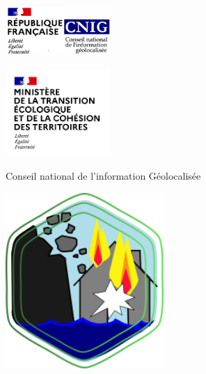 \documentclass[a4paper,12pt]{article}
\begin{document}
\begin{titlepage}
    \centering

    \begin{minipage}{0.45\textwidth}
        \raggedright
        \includegraphics[width=4cm]{./ressources/logo-cnig.png}
    \end{minipage}
    \hfill
    \begin{minipage}{0.45\textwidth}
        \raggedleft
        \includegraphics[width=4cm]{./ressources/ministere-de-la-transition-ecologique-et-solidaire_logo.png} %
    \end{minipage}

    \vspace{1cm} 

    {\marianne\large\color{etatbleu} Conseil national de l'information Géolocalisée\par}

    \vspace{1cm} 

    \includegraphics[width=6cm]{./ressources/logo-gt-risques.png} %
    \vspace{1cm} 


\end{titlepage}
\end{document}
